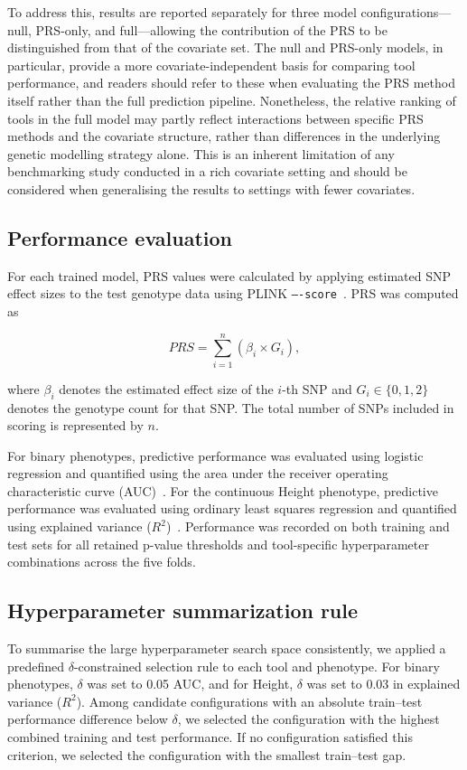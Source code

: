 \documentclass[pdflatex,sn-basic]{sn-jnl}
\begin{document}
To address this, results are reported separately for three model configurations---null, PRS-only, and full---allowing the contribution of the PRS to be distinguished from that of the covariate set. The null and PRS-only models, in particular, provide a more covariate-independent basis for comparing tool performance, and readers should refer to these when evaluating the PRS method itself rather than the full prediction pipeline. Nonetheless, the relative ranking of tools in the full model may partly reflect interactions between specific PRS methods and the covariate structure, rather than differences in the underlying genetic modelling strategy alone. This is an inherent limitation of any benchmarking study conducted in a rich covariate setting and should be considered when generalising the results to settings with fewer covariates.

\subsection*{Performance evaluation}
For each trained model, PRS values were calculated by applying estimated SNP effect sizes to the test genotype data using PLINK \texttt{----score}~\cite{Purcell_2007,Choi2020}. PRS was computed as

\begin{equation}
PRS = \sum_{i=1}^{n} \left( \beta_i \times G_i \right),
\label{Plinkequation}
\end{equation}

where $\beta_i$ denotes the estimated effect size of the $i$-th SNP and $G_i \in \{0,1,2\}$ denotes the genotype count for that SNP. The total number of SNPs included in scoring is represented by $n$.

For binary phenotypes, predictive performance was evaluated using logistic regression and quantified using the area under the receiver operating characteristic curve (AUC)~\cite{Sperandei2014}. For the continuous Height phenotype, predictive performance was evaluated using ordinary least squares regression and quantified using explained variance ($R^2$)~\cite{Zdaniuk2014}. Performance was recorded on both training and test sets for all retained p-value thresholds and tool-specific hyperparameter combinations across the five folds.

\subsection*{Hyperparameter summarization rule}
To summarise the large hyperparameter search space consistently, we applied a predefined $\delta$-constrained selection rule to each tool and phenotype. For binary phenotypes, $\delta$ was set to 0.05 AUC, and for Height, $\delta$ was set to 0.03 in explained variance ($R^2$). Among candidate configurations with an absolute train--test performance difference below $\delta$, we selected the configuration with the highest combined training and test performance. If no configuration satisfied this criterion, we selected the configuration with the smallest train--test gap.
\end{document}
